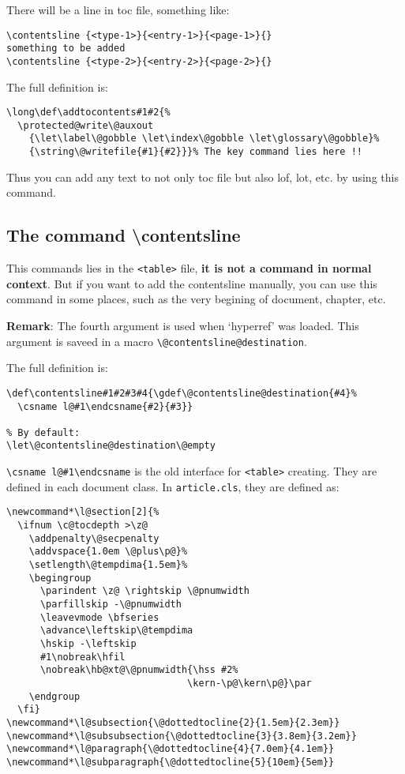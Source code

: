 \documentclass{article}
\begin{document}
There will be a line in toc file, something like:
\begin{lstlisting}
\contentsline {<type-1>}{<entry-1>}{<page-1>}{}
something to be added
\contentsline {<type-2>}{<entry-2>}{<page-2>}{}
\end{lstlisting}

The full definition is:
\begin{lstlisting}
\long\def\addtocontents#1#2{%
  \protected@write\@auxout
    {\let\label\@gobble \let\index\@gobble \let\glossary\@gobble}%
    {\string\@writefile{#1}{#2}}}% The key command lies here !!
\end{lstlisting}

Thus you can add any text to not only toc file but also lof, lot, etc. by using this command.

\subsection{The command \textbackslash contentsline}
This commands lies in the \verb|<table>| file, \textbf{it is not a command in normal context}. But if you want to add the 
contentsline manually, you can use this command in some places, such as the very begining of document, chapter, etc. 

\textbf{Remark}: The fourth argument is used when `hyperref' was loaded. This argument is saveed in a 
macro \verb|\@contentsline@destination|. 

The full definition is:
\begin{lstlisting}
\def\contentsline#1#2#3#4{\gdef\@contentsline@destination{#4}%
  \csname l@#1\endcsname{#2}{#3}}

% By default:
\let\@contentsline@destination\@empty
\end{lstlisting}

\verb|\csname l@#1\endcsname| is the old interface for \verb|<table>| creating. They are defined in each document class. In 
\verb|article.cls|, they are defined as:
\begin{lstlisting}
\newcommand*\l@section[2]{%
  \ifnum \c@tocdepth >\z@
    \addpenalty\@secpenalty
    \addvspace{1.0em \@plus\p@}%
    \setlength\@tempdima{1.5em}%
    \begingroup
      \parindent \z@ \rightskip \@pnumwidth
      \parfillskip -\@pnumwidth
      \leavevmode \bfseries
      \advance\leftskip\@tempdima
      \hskip -\leftskip
      #1\nobreak\hfil
      \nobreak\hb@xt@\@pnumwidth{\hss #2%
                                \kern-\p@\kern\p@}\par
    \endgroup
  \fi}
\newcommand*\l@subsection{\@dottedtocline{2}{1.5em}{2.3em}}
\newcommand*\l@subsubsection{\@dottedtocline{3}{3.8em}{3.2em}}
\newcommand*\l@paragraph{\@dottedtocline{4}{7.0em}{4.1em}}
\newcommand*\l@subparagraph{\@dottedtocline{5}{10em}{5em}}
\end{lstlisting}
\end{document}
